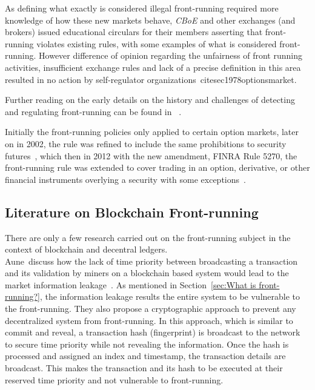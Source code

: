 As defining what exactly is considered illegal front-running required more knowledge of how these new markets behave, \textit{CBoE} and other exchanges (and brokers) issued educational circulars for their members asserting that front-running violates existing rules, with some examples of what is considered front-running. However difference of opinion regarding the unfairness of front running activities, insufficient exchange rules and lack of a precise definition in this area resulted in no action by self-regulator organizations~cite{sec1978optionsmarket}. 

Further reading on the early details on the history and challenges of detecting and regulating front-running can be found in~\cite{markham1988front} . %

Initially the front-running policies only applied to certain option markets, later on in 2002, the rule was refined to include the same prohibitions to security futures~\cite{finra_2002}, which then in 2012 with the new amendment, FINRA Rule 5270, the front-running rule was extended to cover trading in an option, derivative, or other financial instruments overlying a security with some exceptions~\cite{sec2012frontrunning, finra_2012}. 


\subsection{Literature on Blockchain Front-running}
There are only a few research carried out on the front-running subject in the context of blockchain and decentral ledgers. \\

Aune~\etal discuss how the lack of time priority between broadcasting a transaction and its validation by miners on a blockchain based system would lead to the market information leakage~\cite{aune2017footprints}. As mentioned in Section~\ref{sec:What is front-running?}, the information leakage results the entire system to be vulnerable to the front-running. They also propose a cryptographic approach to prevent any decentralized system from front-running. In this approach, which is similar to commit and reveal, a transaction hash (fingerprint) is broadcast to the network to secure time priority while not revealing the information. Once the hash is processed and assigned an index and timestamp, the transaction details are broadcast. This makes the transaction and its hash to be executed at their reserved time priority and not vulnerable to front-running.

